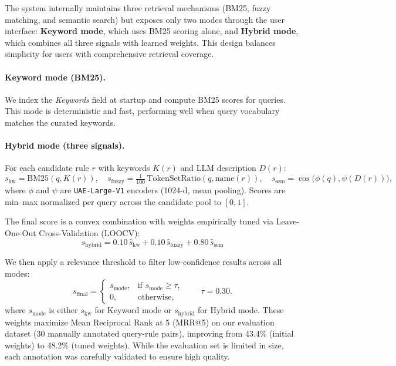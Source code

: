 The system internally maintains three retrieval mechanisms (BM25, fuzzy matching, and semantic search) but exposes only two modes through the user interface: \textbf{Keyword mode}, which uses BM25 scoring alone, and \textbf{Hybrid mode}, which combines all three signals with learned weights. This design balances simplicity for users with comprehensive retrieval coverage.

\paragraph{Keyword mode (BM25).} 
We index the \emph{Keywords} field at startup and compute BM25 scores for queries. This mode is deterministic and fast, performing well when query vocabulary matches the curated keywords.

\paragraph{Hybrid mode (three signals).} 
For each candidate rule $r$ with keywords $K(r)$ and LLM description $D(r)$:
\[
s_{\text{kw}} = \mathrm{BM25}(q, K(r)),\quad s_{\text{fuzzy}} = \tfrac{1}{100}\,\mathrm{TokenSetRatio}(q, \mathrm{name}(r)),\quad s_{\text{sem}} = \cos\!\big(\phi(q), \psi(D(r))\big),
\]
where $\phi$ and $\psi$ are \texttt{UAE-Large-V1} encoders (1024-d, mean pooling). Scores are min–max normalized per query across the candidate pool to $[0,1]$. 

The final score is a convex combination with weights empirically tuned via Leave-One-Out Cross-Validation (LOOCV):
\[
s_{\text{hybrid}} = 0.10\,\widehat{s}_{\text{kw}} + 0.10\,\widehat{s}_{\text{fuzzy}} + 0.80\,\widehat{s}_{\text{sem}}
\]

We then apply a relevance threshold to filter low-confidence results across all modes:
\[
s_{\mathrm{final}} =
\begin{cases}
s_{\mathrm{mode}}, & \text{if } s_{\mathrm{mode}} \ge \tau,\\
0,                 & \text{otherwise},
\end{cases}
\qquad \tau = 0.30.
\]
where $s_{\text{mode}}$ is either $s_{\text{kw}}$ for Keyword mode or $s_{\text{hybrid}}$ for Hybrid mode. These weights maximize Mean Reciprocal Rank at 5 (MRR@5) on our evaluation dataset (30 manually annotated query-rule pairs), improving from 43.4\% (initial weights) to 48.2\% (tuned weights). While the evaluation set is limited in size, each annotation was carefully validated to ensure high quality.

